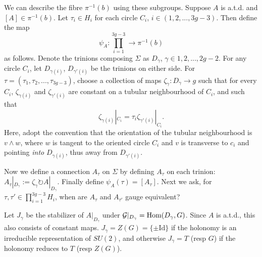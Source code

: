 	We can describe the fibre $\pi^{-1}(b)$ using these subgroups. Suppose $A$ is a.t.d. and $[A] \in \pi^{-1}(b)$. Let $\tau_i \in H_i$ for each circle $C_i$, $i\in (1,2,...,3g-3)$. Then define the map
	\begin{equation}
		\label{e:psiA}
		\psi_A : \prod_{i=1}^{3g-3} \to \pi^{-1}(b)
	\end{equation}
	as follows. Denote the trinions composing $\Sigma$ as $D_{\gamma}$, $\gamma\in{1,2,...,2g-2}$. For any circle $C_i$, let $D_{\gamma(i)}$, $D_{\gamma'(i)}$ be the trinions on either side. For $\tau=(\tau_1,\tau_2,...,\tau_{3g-3})$, choose a collection of maps $\zeta_\gamma : D_\gamma \to g$ such that for every $C_i$, $\zeta_{\gamma(i)}$ and $\zeta_{\gamma'(i)}$ are constant on a tubular neighbourhood of $C_i$, and such that
	\begin{equation}
		\zeta_{\gamma(i)}|_{C_i} = \tau_i \zeta_{\gamma'(i)}|_{C_i}.
	\end{equation}
	Here, adopt the convention that the orientation of the tubular neighbourhood is $v\wedge w$, where $w$ is tangent to the oriented circle $C_i$ and $v$ is transverse to $c_i$ and pointing \textit{into} $D_{\gamma(i)}$, thus away from $D_{\gamma'(i)}$.
	
	Now we define a connection $A_\tau$ on $\Sigma$ by defining $A_\tau$ on each trinion: $A_\tau|_{D_\gamma} := \zeta_\gamma \circlearrowright A|_{D_\gamma}$. Finally define $\psi_A(\tau) = [A_\tau]$. Next we ask, for $\tau,\tau' \in \prod_{i=1}^{3g-3} H_i$, when are $A_\tau$ and $A_{\tau'}$ gauge equivalent? 
	
	Let $J_\gamma$ be the stabilizer of $A|_{D_\gamma}$ under $\mathcal{G}|_{D_\gamma} = \text{Hom}(D_\gamma,G)$. Since $A$ is a.t.d., this also consists of constant maps. $J_\gamma = Z(G) = \{\pm \text{Id}\}$ if the holonomy is an irreducible representation of $SU(2)$, and otherwise $J_\gamma =T$ (resp $G$) if the holonomy reduces to $T$ (resp $Z(G)$).  
	

